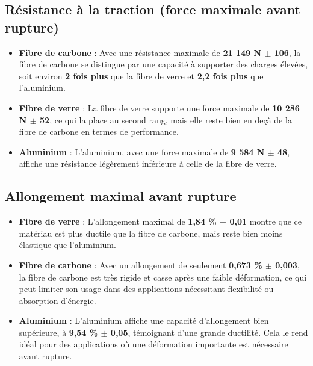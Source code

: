 \subsection{Résistance à la traction (force maximale avant rupture)}

\begin{itemize}
    \item \textbf{Fibre de carbone} : Avec une résistance maximale de \textbf{21 149 N $\pm$ 106}, la fibre de carbone se distingue par une capacité à supporter des charges élevées, soit environ \textbf{2 fois plus} que la fibre de verre et \textbf{2,2 fois plus} que l’aluminium.

    \item \textbf{Fibre de verre} : La fibre de verre supporte une force maximale de \textbf{10 286 N $\pm$ 52}, ce qui la place au second rang, mais elle reste bien en deçà de la fibre de carbone en termes de performance.

    \item \textbf{Aluminium} : L’aluminium, avec une force maximale de \textbf{9 584 N $\pm$ 48}, affiche une résistance légèrement inférieure à celle de la fibre de verre.

\end{itemize}

\subsection{Allongement maximal avant rupture}

\begin{itemize}
\item \textbf{Fibre de verre} : L’allongement maximal de \textbf{1,84 \% $\pm$ 0,01} montre que ce matériau est plus ductile que la fibre de carbone, mais reste bien moins élastique que l’aluminium.

\item \textbf{Fibre de carbone} : Avec un allongement de seulement \textbf{0,673 \% $\pm$ 0,003}, la fibre de carbone est très rigide et casse après une faible déformation, ce qui peut limiter son usage dans des applications nécessitant flexibilité ou absorption d’énergie.

\item \textbf{Aluminium} : L’aluminium affiche une capacité d’allongement bien supérieure, à \textbf{9,54 \% $\pm$ 0,05}, témoignant d’une grande ductilité. Cela le rend idéal pour des applications où une déformation importante est nécessaire avant rupture.
\end{itemize}

